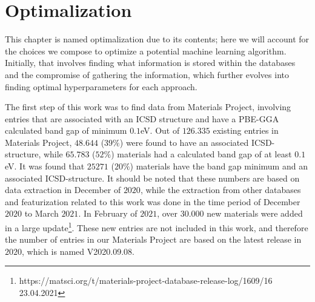 \chapter{Optimalization}

This chapter is named optimalization due to its contents; here we will account for the choices we compose to optimize a potential machine learning algorithm. Initially, that involves finding what information is stored within the databases and the compromise of gathering the information, which further evolves into finding optimal hyperparameters for each approach.

\begin{comment}
\section{Time of extraction and featurization}

The initial thought behind

\begin{table}[!ht]
\centering
\caption{}
\label{tab:timing-extraction}
\noindent\makebox[\textwidth]{
\begin{tabular}{M{3.0cm} M{4.0cm} M{4.0cm}}
  \hline
  \hline
  Database & Extraction period & Estimated time usage  \\
  \hline
  Materials Project & December $2020$ & $5$ min \\
  Citrine Informatics & December $2020$ & $2$ min  \\
  OQMD & December $2020$ & $3$ min \\
  AFLOW & January $2020$ - February $2021$ & $17$ days \\
  AFLOW-ML & January $2020$ - February $2021$ & $16$ days \\
  JARVIS-DFT & January $2020$ & $5$ min \\
  \hline
  \hline
\end{tabular}
}
\end{table}

\end{comment}
The first step of this work was to find data from Materials Project, involving entries that are associated with an ICSD structure and have a PBE-GGA calculated band gap of minimum $0.1$eV. Out of $126.335$ existing entries in Materials Project, $48.644$ ($39\%$) were found to have an associated ICSD-structure, while $65.783$ ($52\%$) materials had a calculated band gap of at least $0.1$eV. It was found that $25271$ ($20\%$) materials have the band gap minimum and an associated ICSD-structure. It should be noted that these numbers are based on data extraction in December of $2020$, while the extraction from other databases and featurization related to this work was done in the time period of December $2020$ to March $2021$. In February of $2021$, over $30.000$ new materials were added in a large update\footnote{https://matsci.org/t/materials-project-database-release-log/1609/16 23.04.2021}. These new entries are not included in this work, and therefore the number of entries in our Materials Project are based on the latest release in $2020$, which is named V2020.09.08.%

